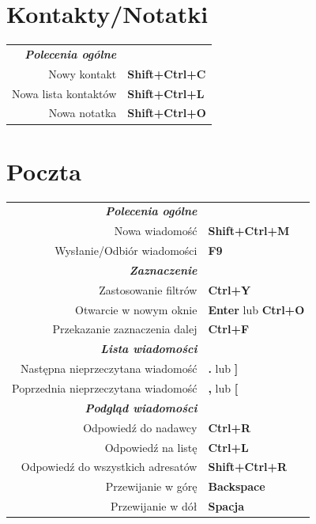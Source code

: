 \documentclass[12pt]{article}
\begin{document}
\begin{landscape}
\begin{center}
\begin{multicols}{2}
	\section*{Kontakty/Notatki}
	\begin{tabular*}{4in}{rp{1.5in}}
		\textit{\textbf{Polecenia ogólne}}	&					\\
		Nowy kontakt				& \textbf{Shift+Ctrl+C}			\\
		Nowa lista kontaktów			& \textbf{Shift+Ctrl+L}			\\
		Nowa notatka				& \textbf{Shift+Ctrl+O}			\\
	\end{tabular*}
	\section*{Poczta}
	\begin{tabular*}{4in}{rp{1.5in}}
		\textit{\textbf{Polecenia ogólne}}	&					\\
		Nowa wiadomość				& \textbf{Shift+Ctrl+M}			\\
		\vspace{1.5mm}
		Wysłanie/Odbiór wiadomości		& \textbf{F9}				\\
		\textit{\textbf{Zaznaczenie}}		&					\\
		Zastosowanie filtrów			& \textbf{Ctrl+Y}			\\
		Otwarcie w nowym oknie 			& \textbf{Enter} lub \textbf{Ctrl+O}	\\
		\vspace{1.5mm}
		Przekazanie zaznaczenia dalej		& \textbf{Ctrl+F}			\\
		\textit{\textbf{Lista wiadomości}}	&					\\
		Następna nieprzeczytana wiadomość	& \textbf{.} lub \textbf{]}		\\
		\vspace{1.5mm}
		Poprzednia nieprzeczytana wiadomość	& \textbf{,} lub \textbf{[}		\\
		\textit{\textbf{Podgląd wiadomości}}	&					\\
		Odpowiedź do nadawcy			& \textbf{Ctrl+R}			\\
		Odpowiedź na listę			& \textbf{Ctrl+L}			\\
		Odpowiedź do wszystkich adresatów	& \textbf{Shift+Ctrl+R}			\\
		Przewijanie w górę			& \textbf{Backspace}			\\
		Przewijanie w dół			& \textbf{Spacja}			\\
	\end{tabular*}

\end{multicols}
\end{center}
\end{landscape}
\end{document}
